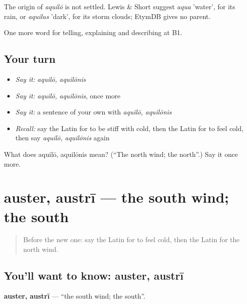 \begin{cousinweb}
The origin of \emph{aquilō} is not settled. Lewis \& Short suggest \emph{aqua} 'water', for its rain, or \emph{aquilus} 'dark', for its storm clouds; EtymDB gives no parent.
\end{cousinweb}

\begin{grammarlens}[title={What you've built}]
One more word for telling, explaining and describing at B1.
\end{grammarlens}

\subsection*{Your turn}
\begin{itemize}
\raggedright
  \item \emph{Say it:} \emph{aquilō, aquilōnis}
  \item \emph{Say it:} \emph{aquilō, aquilōnis}, once more
  \item \emph{Say it:} a sentence of your own with \emph{aquilō, aquilōnis}
  \item \emph{Recall:} say the Latin for to be stiff with cold, then the Latin for to feel cold, then say \emph{aquilō, aquilōnis} again
\end{itemize}

\begin{tcolorbox}[breakable,colback=teal!4,colframe=teal!35!black,title={Before you move on}]
What does aquilō, aquilōnis mean? (\textquotedblleft{}The north wind; the north\textquotedblright{}.) Say it once more.
\end{tcolorbox}
\section[auster, austrī]{auster, austrī — the south wind; the south}

\label{lesson:LA-C487-auster}



\begin{quote}
Before the new one: say the Latin for to feel cold, then the Latin for the north wind.
\end{quote}

\subsection*{You'll want to know: auster, austrī}
\textbf{auster, austrī} — \textquotedblleft{}the south wind; the south\textquotedblright{}.

